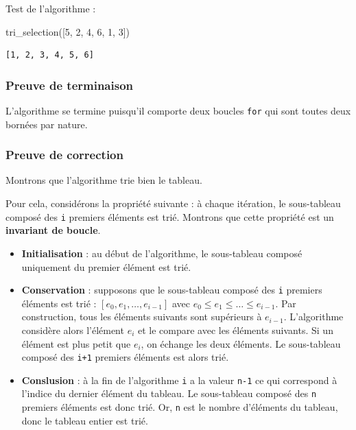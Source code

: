 \documentclass[
  french,
  a4paper,
  DIV=11,
  numbers=noendperiod]{scrartcl}
\newenvironment{Shaded}{\begin{snugshade}}{\end{snugshade}}
\newcommand{\DecValTok}[1]{\textcolor[rgb]{0.68,0.00,0.00}{#1}}
\newcommand{\NormalTok}[1]{\textcolor[rgb]{0.00,0.23,0.31}{#1}}
\providecommand{\tightlist}{%
  \setlength{\itemsep}{0pt}\setlength{\parskip}{0pt}}
\begin{document}
Test de l'algorithme :

\begin{Shaded}
\begin{Highlighting}[]
\NormalTok{tri\_selection([}\DecValTok{5}\NormalTok{, }\DecValTok{2}\NormalTok{, }\DecValTok{4}\NormalTok{, }\DecValTok{6}\NormalTok{, }\DecValTok{1}\NormalTok{, }\DecValTok{3}\NormalTok{])}
\end{Highlighting}
\end{Shaded}

\begin{verbatim}
[1, 2, 3, 4, 5, 6]
\end{verbatim}

\subsubsection{Preuve de terminaison}\label{preuve-de-terminaison-1}

L'algorithme se termine puisqu'il comporte deux boucles \texttt{for} qui
sont toutes deux bornées par nature.

\subsubsection{Preuve de correction}\label{preuve-de-correction-1}

Montrons que l'algorithme trie bien le tableau.

Pour cela, considérons la propriété suivante : à chaque itération, le
sous-tableau composé des \texttt{i} premiers éléments est trié. Montrons
que cette propriété est un \textbf{invariant de boucle}.

\begin{itemize}
\tightlist
\item
  \textbf{Initialisation} : au début de l'algorithme, le sous-tableau
  composé uniquement du premier élément est trié.
\item
  \textbf{Conservation} : supposons que le sous-tableau composé des
  \texttt{i} premiers éléments est trié :
  \([e_0, e_1, \ldots, e_{i-1}]\) avec
  \(e_0\leqslant e_1\leqslant \ldots \leqslant e_{i-1}\). Par
  construction, tous les éléments suivants sont supérieurs à
  \(e_{i-1}\). L'algorithme considère alors l'élément \(e_i\) et le
  compare avec les éléments suivants. Si un élément est plus petit que
  \(e_i\), on échange les deux éléments. Le sous-tableau composé des
  \texttt{i+1} premiers éléments est alors trié.
\item
  \textbf{Conslusion} : à la fin de l'algorithme \texttt{i} a la valeur
  \texttt{n-1} ce qui correspond à l'indice du dernier élément du
  tableau. Le sous-tableau composé des \texttt{n} premiers éléments est
  donc trié. Or, \texttt{n} est le nombre d'éléments du tableau, donc le
  tableau entier est trié.
\end{itemize}
\end{document}

